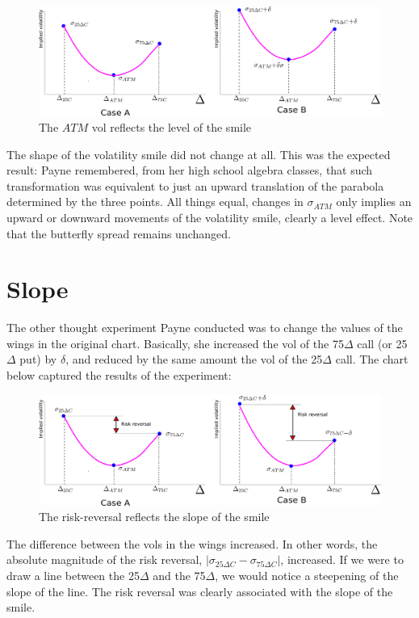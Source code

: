 \documentclass[]{book}
\theoremstyle{definition}
\theoremstyle{definition}
\theoremstyle{definition}
\theoremstyle{remark}
\begin{document}
\begin{figure}
\includegraphics[width=1\linewidth]{images/figRRLevel} \caption{The $ATM$ vol reflects the level of the smile}\label{fig:unnamed-chunk-27}
\end{figure}

The shape of the volatility smile did not change at all. This was the
expected result: Payne remembered, from her high school algebra classes,
that such transformation was equivalent to just an upward translation of
the parabola determined by the three points. All things equal, changes
in \(\sigma_{ATM}\) only implies an upward or downward movements of the
volatility smile, clearly a level effect. Note that the butterfly spread
remains unchanged.

\section{Slope}\label{slope}

The other thought experiment Payne conducted was to change the values of
the wings in the original chart. Basically, she increased the vol of the
75\(\Delta\) call (or 25\(\Delta\) put) by \(\delta\), and reduced by
the same amount the vol of the 25\(\Delta\) call. The chart below
captured the results of the experiment:

\begin{figure}
\includegraphics[width=1\linewidth]{images/figRRSlope} \caption{The risk-reversal reflects the slope of the smile}\label{fig:unnamed-chunk-28}
\end{figure}

The difference between the vols in the wings increased. In other words,
the absolute magnitude of the risk reversal,
\(|\sigma_{25\Delta C} - \sigma_{75\Delta C}|\), increased. If we were
to draw a line between the 25\(\Delta\) and the 75\(\Delta\), we would
notice a steepening of the slope of the line. The risk reversal was
clearly associated with the slope of the smile.
\end{document}
